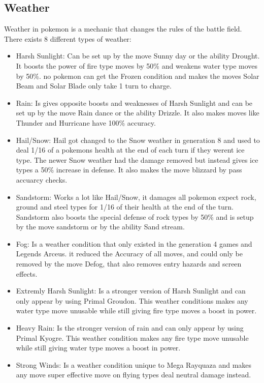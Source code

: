\subsection{Weather}
Weather in pokemon is a mechanic that changes the rules of the battle field. There exists 8 different types of weather: \cite{Weather}
\begin{itemize}
  \item Harsh Sunlight: Can be set up by the move Sunny day or the ability Drought. It boosts the power of fire type moves by 50\% and weakens 
    water type moves by 50\%. no pokemon can get the Frozen condition and makes the moves Solar Beam and Solar Blade only take 1 turn to charge.
  \item Rain: Is gives opposite boosts and weaknesses of Harsh Sunlight and can be set up by the move Rain dance or the ability Drizzle. It also makes moves
    like Thunder and Hurricane have 100\% accuracy.
  \item Hail/Snow: Hail got changed to the Snow weather in generation 8 and used to deal 1/16 of a pokemons health at the end of each turn if they werent ice 
    type. The newer Snow weather had the damage removed but instead gives ice types a 50\% increase in defense. It also makes the move blizzard by 
    pass accuarcy checks.
  \item Sandstorm: Works a lot like Hail/Snow, it damages all pokemon expect rock, ground and steel types for 1/16 of their health at the end of the turn. 
    Sandstorm also boosts the special defense of rock types by 50\% and is setup by the move sandstorm or by the ability Sand stream.
  \item Fog: Is a weather condition that only existed in the generation 4 games and Legends Arceus. it reduced the Accuracy of all moves, 
    and could only be removed by the move Defog, that also removes entry hazards and screen effects.
  \item Extremly Harsh Sunlight: Is a stronger version of Harsh Sunlight and can only appear by using Primal Groudon. This weather conditions makes any 
    water type move unusable while still giving fire type moves a boost in power. 
  \item Heavy Rain: Is the stronger version of rain and can only appear by using Primal Kyogre. This weather condition makes any fire type move unusable 
    while still giving water type moves a boost in power.
  \item Strong Winds: Is a weather condition unique to Mega Rayquaza and makes any move super effective move on flying types deal neutral damage instead.
\end{itemize}


